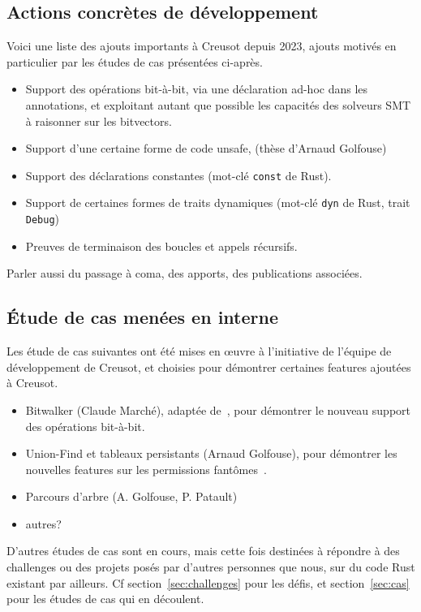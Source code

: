 \documentclass[a4paper,11pt]{article}
\begin{document}
\subsection{Actions concrètes de développement}

Voici une liste des ajouts importants à Creusot depuis 2023, ajouts motivés en particulier par les études de cas présentées ci-après.
\begin{itemize}
\item Support des opérations bit-à-bit, via une déclaration ad-hoc dans les
  annotations, et exploitant autant que possible les capacités des solveurs SMT
  à raisonner sur les bitvectors.
\item Support d'une certaine forme de code unsafe, (thèse d'Arnaud Golfouse)
\item Support des déclarations constantes (mot-clé \texttt{const} de Rust).
\item Support de certaines formes de traits dynamiques (mot-clé \texttt{dyn} de
  Rust, trait \texttt{Debug})
\item Preuves de terminaison des boucles et appels récursifs.
\end{itemize}

Parler aussi du passage à coma, des apports, des publications associées. 


\subsection{Étude de cas menées en interne}

Les étude de cas suivantes ont été mises en œuvre à l'initiative de l'équipe de
développement de Creusot, et choisies pour démontrer certaines features ajoutées
à Creusot.
\begin{itemize}
\item Bitwalker (Claude Marché), adaptée de~\cite{fumex16nfm}, pour démontrer le
  nouveau support des opérations bit-à-bit.
\item Union-Find et tableaux persistants (Arnaud Golfouse), pour démontrer les
  nouvelles features sur les permissions fantômes~\cite{golfouse26cpp}.
\item Parcours d'arbre (A. Golfouse, P. Patault)~\cite{golfouse26jfla}
\item autres? 
\end{itemize}

D'autres études de cas sont en cours, mais cette fois destinées à répondre à des
challenges ou des projets posés par d'autres personnes que nous, sur du code
Rust existant par ailleurs. Cf section~\ref{sec:challenges} pour les défis, et
section~\ref{sec:cas} pour les études de cas qui en découlent.
\end{document}

